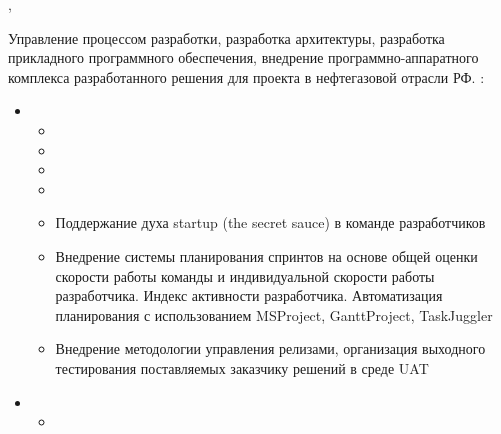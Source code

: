 \documentclass[11pt,a4paper,sans]{moderncv}        %
\begin{document}
%
%


{\protect{}}
{\cityspb, \country}
{}
{
	{Управление процессом разработки, разработка архитектуры, разработка прикладного программного обеспечения, внедрение программно-аппаратного комплекса разработанного решения для проекта в нефтегазовой отрасли РФ.}
	{}
	\newline{}
	\achievements:
	\begin{itemize}
		\item {}
		\begin{itemize}
			\item {}
			\item {}
			\item {}
			\item {}
			\item {}
				{Поддержание духа startup (the secret sauce) в команде разработчиков}
				{}
			\item {}
				{Внедрение системы планирования спринтов на основе общей оценки скорости работы команды и индивидуальной скорости работы разработчика. Индекс активности разработчика. Автоматизация планирования с использованием MSProject, GanttProject, TaskJuggler}
				{}
			\item {}
				{Внедрение методологии управления релизами, организация выходного тестирования поставляемых заказчику решений в среде UAT}
				{}
		\end{itemize}
		\item {}
		\begin{itemize}
			\item {}

\end{itemize}
\end{itemize}}
\end{document}

